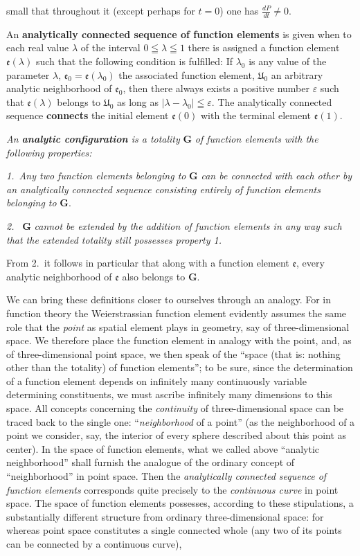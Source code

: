 \documentclass{article}
\begin{document}
small that throughout it (except perhaps for $t = 0$) one has $\frac{dP}{dt} \neq 0$.

An \textbf{analytically connected sequence of function elements} is given when to each real value $\lambda$ of the interval $0 \leqq \lambda \leqq 1$ there is assigned a function element $\mathfrak{e}(\lambda)$ such that the following condition is fulfilled: If $\lambda_0$ is any value of the parameter $\lambda$, $\mathfrak{e}_0 = \mathfrak{e}(\lambda_0)$ the associated function element, $\mathfrak{U}_0$ an arbitrary analytic neighborhood of $\mathfrak{e}_0$, then there always exists a positive number $\varepsilon$ such that $\mathfrak{e}(\lambda)$ belongs to $\mathfrak{U}_0$ as long as $|\lambda - \lambda_0| \leqq \varepsilon$. The analytically connected sequence \textbf{connects} the initial element $\mathfrak{e}(0)$ with the terminal element $\mathfrak{e}(1)$.

\emph{An \textbf{analytic configuration} is a totality} $\mathbf{G}$ \emph{of function elements with the following properties:}

\emph{1.\ Any two function elements belonging to} $\mathbf{G}$ \emph{can be connected with each other by an analytically connected sequence consisting entirely of function elements belonging to} $\mathbf{G}$.

\emph{2.\ } $\mathbf{G}$ \emph{cannot be extended by the addition of function elements in any way such that the extended totality still possesses property 1.}

From 2.\ it follows in particular that along with a function element $\mathfrak{e}$, every analytic neighborhood of $\mathfrak{e}$ also belongs to $\mathbf{G}$.

We can bring these definitions closer to ourselves through an analogy. For in function theory the Weierstrassian function element evidently assumes the same role that the \emph{point} as spatial element plays in geometry, say of three-dimensional space. We therefore place the function element in analogy with the point, and, as of three-dimensional point space, we then speak of the ``space (that is: nothing other than the totality) of function elements''; to be sure, since the determination of a function element depends on infinitely many continuously variable determining constituents, we must ascribe infinitely many dimensions to this space. All concepts concerning the \emph{continuity} of three-dimensional space can be traced back to the single one: ``\emph{neighborhood} of a point'' (as the neighborhood of a point we consider, say, the interior of every sphere described about this point as center). In the space of function elements, what we called above ``analytic neighborhood'' shall furnish the analogue of the ordinary concept of ``neighborhood'' in point space. Then the \emph{analytically connected sequence of function elements} corresponds quite precisely to the \emph{continuous curve} in point space. The space of function elements possesses, according to these stipulations, a substantially different structure from ordinary three-dimensional space: for whereas point space constitutes a single connected whole (any two of its points can be connected by a continuous curve),
\end{document}

